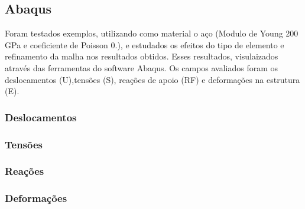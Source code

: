 \subsection*{Abaqus}


\begin{DoxyItemize}
\item Foram testados exemplos, utilizando como material o aço (Modulo de Young 200 G\+Pa e coeficiente de Poisson 0.), e estudados os efeitos do tipo de elemento e refinamento da malha nos resultados obtidos. Esses resultados, visulaizados através das ferramentas do software Abaqus. Os campos avaliados foram os deslocamentos (U),tensões (S), reações de apoio (RF) e deformações na estrutura (E).
\end{DoxyItemize}

\subsubsection*{Deslocamentos}

\subsubsection*{}

\subsubsection*{Tensões}

\subsubsection*{}

\subsubsection*{Reações}

\subsubsection*{}

\subsubsection*{Deformações}

\subsubsection*{}

